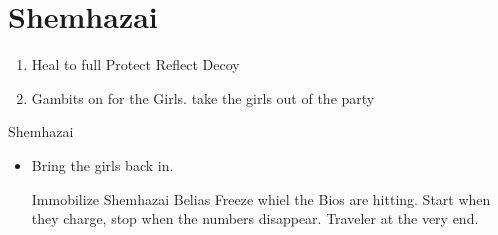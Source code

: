 \chapter{Shemhazai}

\begin{enumerate}
\item Heal \vaan to full
\vaanf Protect \vaan
\penelof Reflect \vaan
\ashef Decoy \vaan
\item Gambits on for the Girls. take the girls out of the party
\end{enumerate}
\begin{battle}{Shemhazai}
\begin{itemize}
\item Bring the girls back in.
\begin{gambit}
\begin{itemize}
\end{itemize}
\end{gambit}
\vaanf Immobilize Shemhazai
\vaanf Belias Freeze whiel the Bios are hitting. Start when they charge, stop when the numbers disappear.
\vaanf Traveler at the very end.
\end{itemize}
\end{battle}